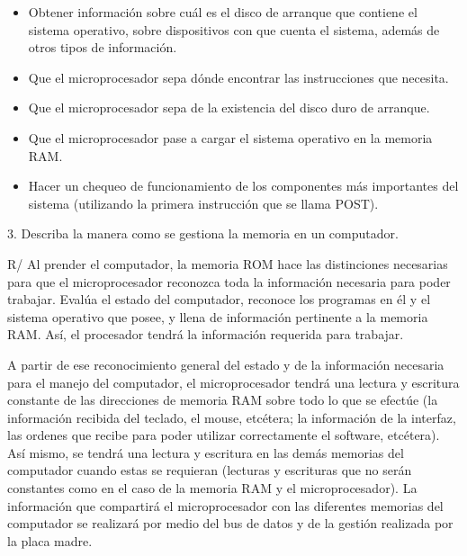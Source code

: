 \documentclass{article}
\begin{document}
\begin{itemize}
\begin{itemize}
        \item 
            Obtener información sobre cuál es el disco de arranque que contiene el sistema operativo, sobre dispositivos con que cuenta el sistema, además de otros tipos de información.
            
        \item
            Que el microprocesador sepa dónde encontrar las instrucciones que necesita.
            
        \item
            Que el microprocesador sepa de la existencia del disco duro de arranque.
            
        \item
            Que el microprocesador pase a cargar el sistema operativo en la memoria RAM.
            
        \item
            Hacer un chequeo de funcionamiento de los componentes más importantes del sistema (utilizando la primera instrucción que se llama POST).
            
        \end{itemize}

\end{itemize}

\vspace{1.0cm}
3. Describa la manera como se gestiona la memoria en un computador.

\vspace{0.3cm}
R/ Al prender el computador, la memoria ROM hace las distinciones necesarias para que el microprocesador reconozca toda la información necesaria para poder trabajar. Evalúa el estado del computador, reconoce los programas en él y el sistema operativo que posee, y llena de información pertinente a la memoria RAM. Así, el procesador tendrá la información requerida para trabajar.

A partir de ese reconocimiento general del estado y de la información necesaria para el manejo del computador, el microprocesador tendrá una lectura y escritura constante de las direcciones de memoria RAM sobre todo lo que se efectúe (la información recibida del teclado, el mouse, etcétera; la información de la interfaz, las ordenes que recibe para poder utilizar correctamente el software, etcétera). Así mismo, se tendrá una lectura y escritura en las demás memorias del computador cuando estas se requieran (lecturas y escrituras que no serán constantes como en el caso de la memoria RAM y el microprocesador). La información que compartirá el microprocesador con las diferentes memorias del computador se realizará por medio del bus de datos y de la gestión realizada por la placa madre.
\end{document}
